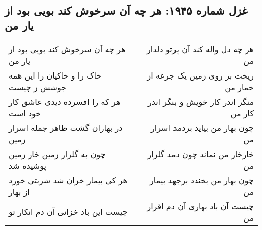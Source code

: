 \begin{center}
\section*{غزل شماره ۱۹۴۵: هر چه آن سرخوش کند بویی بود از یار من}
\label{sec:1945}
\begin{longtable}{l p{0.5cm} r}
هر چه آن سرخوش کند بویی بود از یار من
&&
هر چه دل واله کند آن پرتو دلدار من
\\
خاک را و خاکیان را این همه جوشش ز چیست
&&
ریخت بر روی زمین یک جرعه از خمار من
\\
هر که را افسرده دیدی عاشق کار خود است
&&
منگر اندر کار خویش و بنگر اندر کار من
\\
در بهاران گشت ظاهر جمله اسرار زمین
&&
چون بهار من بیاید بردمد اسرار من
\\
چون به گلزار زمین خار زمین پوشیده شد
&&
خارخار من نماند چون دمد گلزار من
\\
هر کی بیمار خزان شد شربتی خورد از بهار
&&
چون بهار من بخندد برجهد بیمار من
\\
چیست این باد خزانی آن دم انکار تو
&&
چیست آن باد بهاری آن دم اقرار من
\\
\end{longtable}
\end{center}
